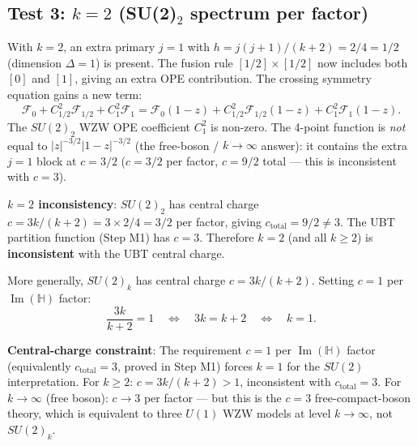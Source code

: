 \documentclass[12pt,a4paper]{article}
\theoremstyle{definition}
\theoremstyle{remark}
\begin{document}
\subsection{Test 3: $k = 2$ (SU(2)$_2$ spectrum per factor)}

With $k = 2$, an extra primary $j = 1$ with $h = j(j+1)/(k+2) = 2/4 = 1/2$
(dimension $\Delta = 1$) is present.  The fusion rule $[1/2] \times [1/2]$
now includes both $[0]$ and $[1]$, giving an extra OPE contribution.
The crossing symmetry equation gains a new term:
\begin{equation}
  \mathcal{F}_0 + C_{1/2}^2 \mathcal{F}_{1/2} + C_1^2 \mathcal{F}_1
  =
  \mathcal{F}_0(1-z) + C_{1/2}^2 \mathcal{F}_{1/2}(1-z) + C_1^2 \mathcal{F}_1(1-z).
  \label{eq:m3:crossing_k2}
\end{equation}
The $SU(2)_2$ WZW OPE coefficient $C_1^2$ is non-zero.  The 4-point function
is \emph{not} equal to $|z|^{-3/2}|1-z|^{-3/2}$ (the free-boson / $k \to \infty$
answer): it contains the extra $j=1$ block at $c=3/2$ ($c=3/2$ per factor,
$c=9/2$ total — this is inconsistent with $c=3$).

\begin{warnbox}
\textbf{$k=2$ inconsistency}: $SU(2)_2$ has central charge
$c = 3k/(k+2) = 3 \times 2/4 = 3/2$ per factor, giving $c_{\mathrm{total}} = 9/2
\neq 3$.  The UBT partition function (Step M1) has $c = 3$.  Therefore $k = 2$
(and all $k \geq 2$) is \textbf{inconsistent} with the UBT central charge.
\end{warnbox}

\medskip
More generally, $SU(2)_k$ has central charge $c = 3k/(k+2)$.  Setting $c = 1$
per $\operatorname{Im}(\mathbb{H})$ factor:
\begin{equation}
  \frac{3k}{k+2} = 1 \quad \Longleftrightarrow \quad 3k = k + 2
  \quad \Longleftrightarrow \quad k = 1.
  \label{eq:m3:c_constraint}
\end{equation}

\begin{resultbox}
\textbf{Central-charge constraint}: The requirement $c = 1$ per
$\operatorname{Im}(\mathbb{H})$ factor (equivalently $c_{\mathrm{total}} = 3$,
proved in Step M1) forces $k = 1$ for the $SU(2)$ interpretation.
For $k \geq 2$: $c = 3k/(k+2) > 1$, inconsistent with $c_{\mathrm{total}} = 3$.
For $k \to \infty$ (free boson): $c \to 3$ per factor — but this is the $c=3$
free-compact-boson theory, which is equivalent to three $U(1)$ WZW models at
level $k \to \infty$, not $SU(2)_k$.
\end{resultbox}
\end{document}
